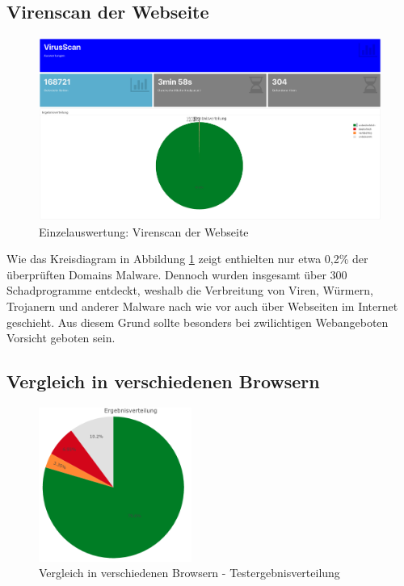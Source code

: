 \subsection{Virenscan der Webseite}
\begin{figure}[H]
  \centering
  \includegraphics[width=\textwidth]{images/stats/virusscan}
  \caption[Einzelauswertung: Virenscan der Webseite]{Einzelauswertung: Virenscan der Webseite\protect\footnotemark}
  \label{fig:analyse-virusscan}
\end{figure}

Wie das Kreisdiagram in Abbildung \ref{fig:analyse-virusscan} zeigt enthielten nur etwa 0,2\% der überprüften Domains Malware. Dennoch wurden insgesamt über 300 Schadprogramme entdeckt, weshalb die Verbreitung von Viren, Würmern, Trojanern und anderer Malware nach wie vor auch über Webseiten im Internet geschieht. Aus diesem Grund sollte besonders bei zwilichtigen Webangeboten Vorsicht geboten sein.

\subsection{Vergleich in verschiedenen Browsern}
\begin{figure}[H]
  \centering
  \includegraphics[width=5cm]{images/stats/diaheaderinspection}
  \caption{Vergleich in verschiedenen Browsern - Testergebnisverteilung}
  \label{fig:analyse-diaheaderinspection}
\end{figure}

